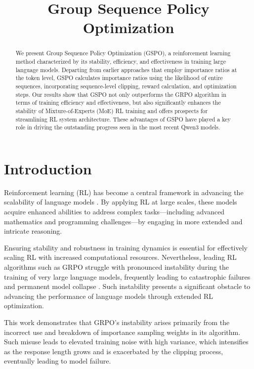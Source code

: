 \title{Group Sequence Policy Optimization}

\begin{abstract}
We present Group Sequence Policy Optimization (GSPO), a reinforcement learning method characterized by its stability, efficiency, and effectiveness in training large language models. Departing from earlier approaches that employ importance ratios at the token level, GSPO calculates importance ratios using the likelihood of entire sequences, incorporating sequence-level clipping, reward calculation, and optimization steps. Our results show that GSPO not only outperforms the GRPO algorithm in terms of training efficiency and effectiveness, but also significantly enhances the stability of Mixture-of-Experts (MoE) RL training and offers prospects for streamlining RL system architecture. These advantages of GSPO have played a key role in driving the outstanding progress seen in the most recent Qwen3 models.
\end{abstract}

\section{Introduction}
\label{sec:intro}

Reinforcement learning (RL) has become a central framework in advancing the scalability of language models \citep{o1,dpsk-r1,qwq32b,qwen3}. By applying RL at large scales, these models acquire enhanced abilities to address complex tasks—including advanced mathematics and programming challenges—by engaging in more extended and intricate reasoning.

Ensuring stability and robustness in training dynamics is essential for effectively scaling RL with increased computational resources. Nevertheless, leading RL algorithms such as GRPO \citep{grpo} struggle with pronounced instability during the training of very large language models, frequently leading to catastrophic failures and permanent model collapse \citep{qwen3, minimax-m1}. Such instability presents a significant obstacle to advancing the performance of language models through extended RL optimization.

This work demonstrates that GRPO's instability arises primarily from the incorrect use and breakdown of importance sampling weights in its algorithm. Such misuse leads to elevated training noise with high variance, which intensifies as the response length grows and is exacerbated by the clipping process, eventually leading to model failure.

